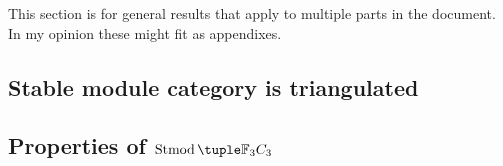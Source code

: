 This section is for general results that apply to multiple parts in the document. In my opinion these might fit as appendixes.

\subsection{Stable module category is triangulated}


\subsection{Properties of \texorpdfstring{\( \Stmod{\Fb_3 C_3} \)}{Stmod(F\_3C\_3)}} 

